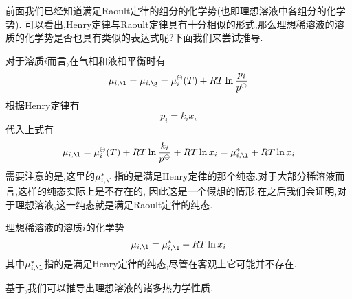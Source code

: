 \documentclass{ctexart}
\begin{document}
\indent 前面我们已经知道满足Raoult定律的组分的化学势(也即理想溶液中各组分的化学势).%
可以看出,Henry定律与Raoult定律具有十分相似的形式,那么理想稀溶液的溶质的化学势是否也具有类似的表达式呢?下面我们来尝试推导.
\begin{derivation}
    对于溶质$i$而言,在气相和液相平衡时有
    \[\mu_{i,\l}=\mu_{i,\g}=\mu_{i}^\ominus(T)+RT\ln\dfrac{p_i}{p^\ominus}\]
    根据Henry定律有
    \[p_i=k_{i}x_{i}\]
    代入上式有
    \[\mu_{i,\l}=\mu_{i}^\ominus(T)+RT\ln\dfrac{k_i}{p^\ominus}+RT\ln x_i=\mu_{i,\l}^\ast+RT\ln x_i\]
    需要注意的是,这里的$\mu_{i,\l}^\ast$指的是满足Henry定律的那个纯态.对于大部分稀溶液而言,这样的纯态实际上是不存在的,%
    因此这是一个假想的情形.在之后我们会证明,对于理想溶液,这一纯态就是满足Raoult定律的纯态.
\end{derivation}
\begin{theorem}[4C.1.5 理想稀溶液的溶质的化学势]
    理想稀溶液的溶质$i$的化学势
    \[\mu_{i,\l}=\mu_{i,\l}^\ast+RT\ln x_i\]
    其中$\mu_{i,\l}^\ast$指的是满足Henry定律的纯态,尽管在客观上它可能并不存在.
\end{theorem}
\vspace{8pt}
\indent 基于,我们可以推导出理想溶液的诸多热力学性质.
\end{document}
